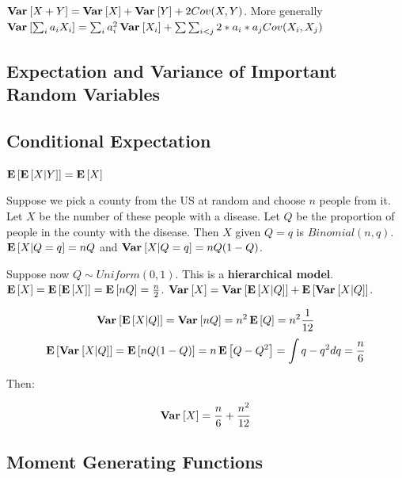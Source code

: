 \documentclass[10pt]{article}
\begin{document}
\begin{theorem}
    $\Var{X + Y} = \Var{X} + \Var{Y} + 2Cov(X,Y)$. More generally $\Var{\sum_i
    a_i X_i} = \sum_i a_i^2 \Var{X_i} + \sum \sum_{i < j} 2*a_i*a_j Cov(X_i,
    X_j)$
\end{theorem}

\subsection{Expectation and Variance of Important Random Variables}

\subsection{Conditional Expectation}

\begin{definition}
\end{definition}

\begin{definition}
    $\E{\E{X | Y}} = \E{X}$
\end{definition}

\begin{definition}
\end{definition}

\begin{example}
    Suppose we pick a county from the US at random and choose $n$ people from
    it. Let $X$ be the number of these people with a disease. Let $Q$ be the
    proportion of people in the county with the disease. Then $X$ given $Q = q$
    is $Binomial(n, q)$. $\E{X | Q=q} = nQ$ and $\Var{X|Q=q} = nQ(1-Q)$.

    Suppose now $Q \sim Uniform(0, 1)$. This is a \textbf{hierarchical model}.
    $\E{X} = \E{\E{X}} = \E{nQ} = \frac{n}{2}$. $\Var{X} = \Var{\E{X|Q}} +
    \E{\Var{X|Q}}$. 

    \[\Var{\E{X|Q}} = \Var{nQ} = n^2\E{Q} = n^2\frac{1}{12}\]
    \[\E{\Var{X|Q}} = \E{nQ(1-Q)} = n\E{Q-Q^2} = \int{q - q^2 dq} = \frac{n}{6}\]

    Then:

    \[\Var{X} = \frac{n}{6} + \frac{n^2}{12}\]
\end{example}


\subsection{Moment Generating Functions}
\end{document}
